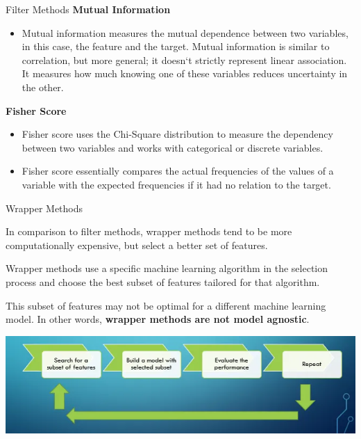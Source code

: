 \documentclass[11pt]{beamer}
\begin{document}
\begin{frame}{Filter Methods}
\textbf{Mutual Information}
	\begin{itemize}
		\item Mutual information measures the mutual dependence between two variables, in this case, the feature and the target. Mutual information is similar to correlation, but more general; it doesn`t strictly represent linear association. It measures how much knowing one of these variables reduces uncertainty in the other.
	\end{itemize}
\textbf{Fisher Score}
	\begin{itemize}
		\item Fisher score uses the Chi-Square distribution to measure the dependency between two variables and works with categorical or discrete variables.
		\item Fisher score essentially compares the actual frequencies of the values of a variable with the expected frequencies if it had no relation to the target.
	\end{itemize}
\end{frame}
\begin{frame}{Wrapper Methods}
	\begin{itemize}
		\item \footnotesize{In comparison to filter methods, wrapper methods tend to be more computationally expensive, but select a better set of features.
		\item Wrapper methods use a specific machine learning algorithm in the selection process and choose the best subset of features tailored for that algorithm. 
		\item This subset of features may not be optimal for a different machine learning model. In other words, \textbf{wrapper methods are not model agnostic}.}
	\end{itemize}
	\begin{center}
	\includegraphics[scale=0.65]{../05-pictures/lesson-2-2_pic_4.png}
	\end{center}
\end{frame}
\end{document}
